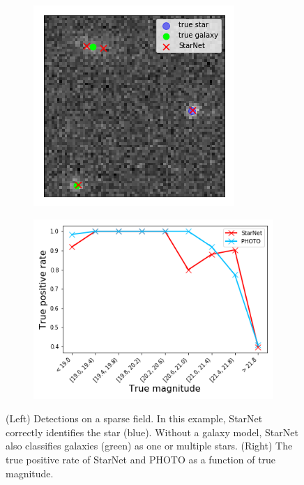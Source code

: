 \begin{figure}[tb]
    \centering
    \begin{subfigure}{0.45\textwidth}
        \includegraphics[width=\textwidth]{figures/sparse_field/sparse_field_detections.png}
    \end{subfigure}
    \begin{subfigure}{0.54\textwidth}
        \includegraphics[width=\textwidth]{figures/sparse_field/sparse_field_tpr.png}
    \end{subfigure}
    \caption{(Left) Detections on a sparse field.
    In this example, StarNet correctly identifies the star (blue).
    Without a galaxy model, StarNet also classifies galaxies (green) as one or multiple stars.
    (Right) The true positive rate of StarNet and PHOTO as a function of true magnitude.}
    \label{fig:sparse_field}
\end{figure}
